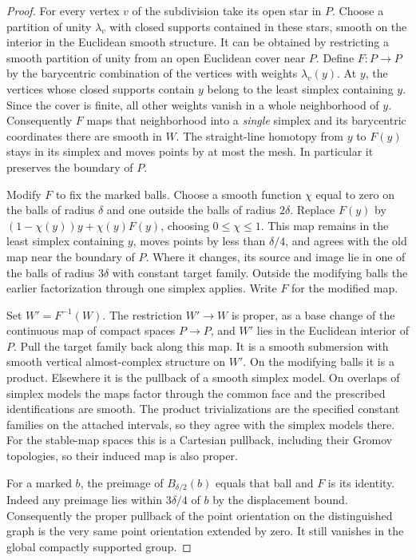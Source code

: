 \begin{proof}
For every vertex $v$ of the subdivision take its open star in $P$.
Choose a partition of unity $\lambda_v$ with closed supports contained
in these stars, smooth on the interior in the Euclidean smooth
structure. It can be obtained by restricting a smooth partition of
unity from an open Euclidean cover near $P$. Define $F:P\to P$ by
the barycentric combination of the vertices with weights
$\lambda_v(y)$. At $y$, the vertices whose closed supports contain
$y$ belong to the least simplex containing $y$. Since the cover is
finite, all other weights vanish in a whole neighborhood of $y$.
Consequently $F$ maps that neighborhood into a \emph{single} simplex
and its barycentric coordinates there are smooth in $W$. The
straight-line homotopy from $y$ to $F(y)$ stays in its simplex and
moves points by at most the mesh. In particular it preserves the
boundary of $P$.

Modify $F$ to fix the marked balls. Choose a smooth function
$\chi$ equal to zero on the balls of radius $\delta$ and one
outside the balls of radius $2\delta$. Replace $F(y)$ by
$(1-\chi(y))y+\chi(y)F(y)$, choosing $0\leq\chi\leq1$. This
map remains in the least simplex containing $y$, moves points by
less than $\delta/4$, and agrees with the old map near the boundary
of $P$. Where it changes, its source and image lie in one of the
balls of radius $3\delta$ with constant target family. Outside
the modifying balls the earlier factorization through one simplex
applies. Write $F$ for the modified map.

Set $W'=F^{-1}(W)$. The restriction $W'\to W$ is proper, as a base
change of the continuous map of compact spaces $P\to P$, and $W'$
lies in the Euclidean interior of $P$. Pull the target family back
along this map. It is a smooth submersion with smooth vertical
almost-complex structure on $W'$. On the modifying balls it is a
product. Elsewhere it is the pullback of a smooth simplex model.
On overlaps of simplex models the maps factor through the common
face and the prescribed identifications are smooth. The product
trivializations are the specified constant families on the attached
intervals, so they agree with the simplex models there. For the stable-map
spaces this is a Cartesian pullback, including their Gromov topologies,
so their induced map is also proper.

For a marked $b$, the preimage of $B_{\delta/2}(b)$ equals that
ball and $F$ is its identity. Indeed any preimage lies within
$3\delta/4$ of $b$ by the displacement bound. Consequently the
proper pullback of the point orientation on the distinguished graph
is the very same point orientation extended by zero. It still
vanishes in the global compactly supported group.
\end{proof}
